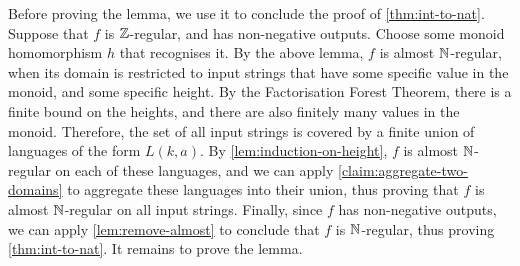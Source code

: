 Before proving the lemma, we use it to conclude the proof of \cref{thm:int-to-nat}. Suppose that $f$ is ${\mathbb Z}$-regular, and has non-negative outputs. Choose some monoid homomorphism $h$ that recognises it. By the above lemma, $f$ is almost ${\mathbb N}$-regular, when its domain is restricted to input strings that have some specific value in the monoid, and some specific height. By the Factorisation Forest Theorem, there is a finite bound on the heights, and there are also finitely many values in the monoid. Therefore, the set of all input strings is covered by a finite union of languages of the form $L(k,a)$. By \cref{lem:induction-on-height}, $f$ is almost ${\mathbb N}$-regular on each of these languages, and we can apply  \cref{claim:aggregate-two-domains} to aggregate these languages into their union, thus proving that  $f$ is almost ${\mathbb N}$-regular on all input strings. Finally, since $f$ has non-negative outputs, we can apply \cref{lem:remove-almost} to conclude that $f$ is ${\mathbb N}$-regular, thus proving \cref{thm:int-to-nat}. It remains to prove the lemma.

